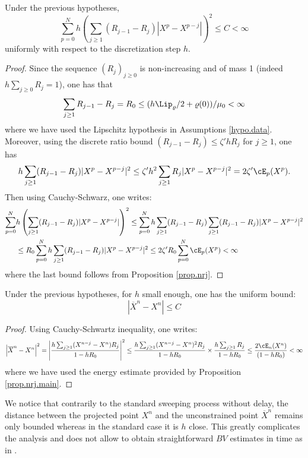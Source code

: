 \documentclass[]{jnsao}
\newcommand{\kernel}{\varrho}
\renewcommand{\tr}{R}
\begin{document}
\begin{corollary}\label{coro.dissip}
	Under the previous hypotheses, 
	$$
	\sum_{p= 0}^N h 
	\left( \sum_{j\ge1} (\tr_{j-1} - \tr_{j}) \left| X^{p} - X^{p-j}\right| \right)^2 \leq  C < \infty 
	$$
	uniformly with respect to the discretization step $h$.
\end{corollary} 
 
\begin{proof}%
	Since the sequence $(\tr_{j})_{j\geq 0}$ is non-increasing and of mass 1 (indeed $h \sum_{j\geq 0} \tr_{j}=1$), one has that
	$$
	\sum_{j\ge1} \tr_{j-1} - \tr_{j} = \tr_0 \leq (h \Lip_\kernel/2  + \kernel(0))/\mu_{0} < \infty
	$$
 where we have used the Lipschitz hypothesis in Assumptions \ref{hypo.data}.
	Moreover, using the discrete ratio bound $(\tr_{j-1}-\tr_j) \leq \zeta' h \tr_j$ for $j\geq 1$,
	one has
	$$
	h \sum_{j\geq 1} (\tr_{j-1} -\tr_{j}) |X^p-X^{p-j}|^2
	\leq \zeta' h^2 \sum_{j\geq 1} \tr_j |X^p-X^{p-j}|^2 = 2\zeta' \cE_p(X^p).
	$$
	Then using Cauchy-Schwarz,
	one writes:
	$$
	\begin{aligned}
		\sum_{p= 0}^N & h \left( \sum_{j\geq1} (\tr_{j-1} -\tr_{j}) |X^p-X^{p-j}| \right)^2  \leq \sum_{p=0}^N h \sum_{j\geq 1} (\tr_{j-1} -\tr_{j})
								\sum_{j\geq 1} (\tr_{j-1} -\tr_{j}) |X^p-X^{p-j}|^2\\
		& \leq  \tr_0 \sum_{p= 0}^N h \sum_{j\geq 1}  (\tr_{j-1} -\tr_{j}) |X^p-X^{p-j}|^2
		\leq  2 \zeta' \tr_0 \sum_{p= 0}^N  \cE_p(X^p)  < \infty
	\end{aligned}
	$$
	where the last bound follows from Proposition \ref{prop.nrj}.
\end{proof} 


\begin{corollary}\label{coro.lag}
	Under the previous hypotheses, for $h$ small enough, one has the uniform bound:
	$$
	\left|\overline{X}^n - X^n\right| \leq C 
	$$
\end{corollary}

\begin{proof}%
	Using Cauchy-Schwartz inequality, one writes:
	$$
	\begin{aligned}
		\left|\overline{X}^n - X^n\right|^2 & 
		= \left| \frac{h \sum_{j\geq 1} (X^{n-j} - X^n) \tr_j}{1-h \tr_0} \right|^2  
		\leq  \frac{h \sum_{j\geq 1} (X^{n-j}-X^n)^2 \tr_j }{1-h \tr_0} \times \frac{h \sum_{j\geq 1} \tr_j}{1-h \tr_0} 		\leq \frac{2 \cE_n(X^n)}{(1-h \tr_0)} < \infty \\
	\end{aligned}
	$$
	where we have used the energy estimate provided by Proposition \ref{prop.nrj.main}.	
\end{proof}
\begin{remark}
	We notice that contrarily to the standard sweeping process without delay, 
	the distance between the projected point $X^n$ and the unconstrained point $\overline{X}^n$ 
	remains only bounded whereas in the standard case it is $h$ close. 
	This greatly complicates the 
	analysis and does not allow to obtain straightforward $BV$ estimates in time as in \cite{mor77}. 
\end{remark}
\end{document}
